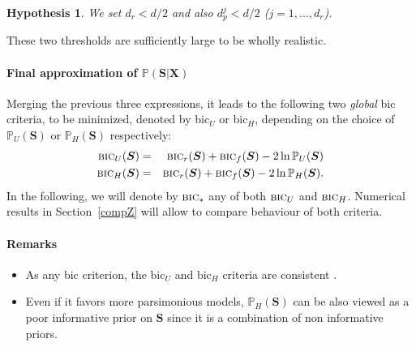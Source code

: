 \documentclass[12pt,a4paper]{report}
\newtheorem{hyp}{Hypothesis}
\begin{document}
\begin{hyp}\label{H5}
We set $d_r<d/2$ and also $d_p^j<d/2$ ($j=1,\ldots,d_r$).
\end{hyp}

These two thresholds are sufficiently large to be wholly realistic.

\paragraph{Final approximation of $\mathbb{P}(\boldsymbol{S}|\boldsymbol{X})$}
Merging the previous three expressions, it leads to the following two {\it global} {\sc bic} criteria, to be minimized, denoted by {\sc bic}$_U$ or {\sc bic}$_H$, depending on the choice of $\mathbb{P}_U(\boldsymbol{S})$ or $\mathbb{P}_H(\boldsymbol{S})$ respectively:
\begin{eqnarray}
\mbox{{\sc bic}}_U(\boldsymbol{S}) & = & \mbox{{\sc bic}}_r(\boldsymbol{S}) + \mbox{{\sc bic}}_f(\boldsymbol{S}) - 2\ln \mathbb{P}_U(\boldsymbol{S}) \\
\mbox{{\sc bic}}_H(\boldsymbol{S}) & = & \mbox{{\sc bic}}_r(\boldsymbol{S}) + \mbox{{\sc bic}}_f(\boldsymbol{S}) - 2\ln \mathbb{P}_H(\boldsymbol{S}).
\end{eqnarray}
In the following, we will denote by $\mbox{{\sc bic}}_*$ any of both $\mbox{{\sc bic}}_U$ and $\mbox{{\sc bic}}_H$. Numerical results in Section~\ref{compZ} will allow to compare behaviour of both criteria.

\paragraph{Remarks}
\begin{itemize}
\item As any {\sc bic} criterion, the {\sc bic}$_U$ and {\sc bic}$_H$ criteria are consistent \cite{BIChuard}.
\item Even if it favors more parsimonious models, $\mathbb{P}_H(\boldsymbol{S})$ can be also viewed as a poor informative prior on $\boldsymbol{S}$ since it is a combination of non informative priors.
\end{itemize}



%	 
%	
\end{document}
